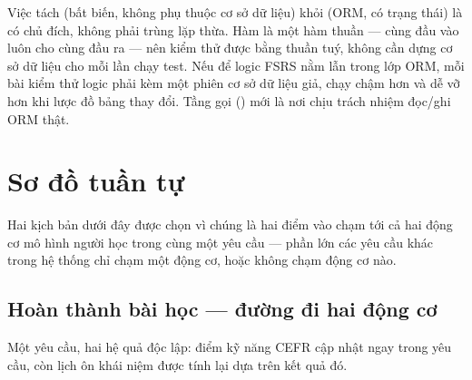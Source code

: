 Việc tách  (bất biến, không phụ thuộc cơ sở dữ liệu) khỏi
 (ORM, có trạng thái) là có chủ đích, không phải trùng lặp thừa.
Hàm  là một hàm thuần — cùng đầu vào luôn cho cùng đầu ra — nên kiểm
thử được bằng  thuần tuý, không cần dựng cơ sở dữ liệu cho mỗi lần chạy test.
Nếu để logic FSRS nằm lẫn trong lớp ORM, mỗi bài kiểm thử logic phải kèm một phiên cơ sở dữ
liệu giả, chạy chậm hơn và dễ vỡ hơn khi lược đồ bảng thay đổi. Tầng gọi
() mới là nơi chịu trách nhiệm đọc/ghi ORM thật.

\section{Sơ đồ tuần tự}

Hai kịch bản dưới đây được chọn vì chúng là hai điểm vào chạm tới cả hai động cơ mô hình
người học trong cùng một yêu cầu — phần lớn các yêu cầu khác trong hệ thống chỉ chạm một
động cơ, hoặc không chạm động cơ nào.

\subsection{Hoàn thành bài học — đường đi hai động cơ}

Một yêu cầu, hai hệ quả độc lập: điểm kỹ năng CEFR cập nhật ngay trong yêu cầu, còn
lịch ôn khái niệm được tính lại dựa trên kết quả đó.

